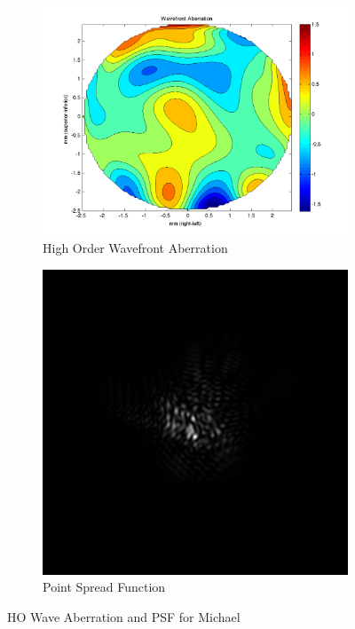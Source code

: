 \documentclass{article}
\begin{document}
\begin{figure}[H]
\begin{subfigure}{.5\textwidth}
  \centering
  \includegraphics[width=1\linewidth]{Michael_WFA.png}
  \caption{High Order Wavefront Aberration}
  \label{fig:michaelhowa}
\end{subfigure}%
\begin{subfigure}{.5\textwidth}
  \centering
  \includegraphics[width=.8\linewidth]{Michael_PSF.png}
  \caption{Point Spread Function}
  \label{fig:michaelpsf}
\end{subfigure}
\caption{HO Wave Aberration and PSF for Michael}
\label{fig:michael}
\end{figure}
\end{document}
